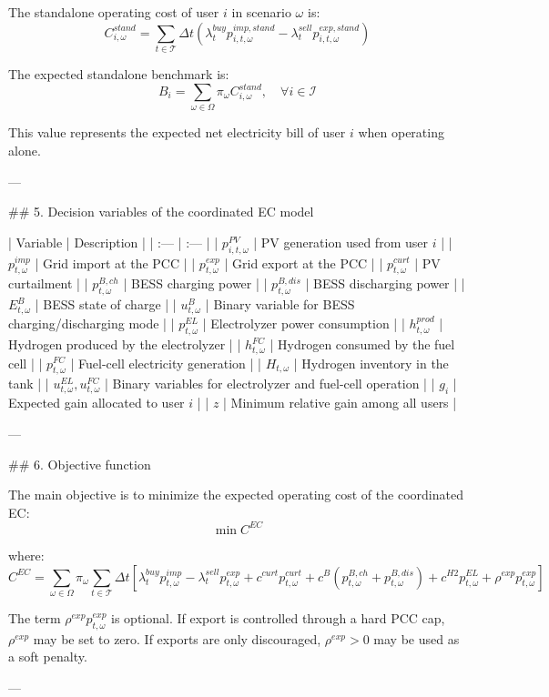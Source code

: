 The standalone operating cost of user $i$ in scenario $\omega$ is:
$$ C^{stand}_{i,\omega}=\sum_{t\in\mathcal{T}}\Delta t \left(\lambda^{buy}_{t}p^{imp,stand}_{i,t,\omega} -\lambda^{sell}_{t}p^{exp,stand}_{i,t,\omega}\right) $$

The expected standalone benchmark is:
$$ B_i=\sum_{\omega\in\Omega}\pi_{\omega}C^{stand}_{i,\omega}, \quad \forall i\in\mathcal{I} $$

This value represents the expected net electricity bill of user $i$ when operating alone.

---

## 5. Decision variables of the coordinated EC model

| Variable | Description |
| :--- | :--- |
| $p^{PV}_{i,t,\omega}$ | PV generation used from user $i$ |
| $p^{imp}_{t,\omega}$ | Grid import at the PCC |
| $p^{exp}_{t,\omega}$ | Grid export at the PCC |
| $p^{curt}_{t,\omega}$ | PV curtailment |
| $p^{B,ch}_{t,\omega}$ | BESS charging power |
| $p^{B,dis}_{t,\omega}$ | BESS discharging power |
| $E^{B}_{t,\omega}$ | BESS state of charge |
| $u^{B}_{t,\omega}$ | Binary variable for BESS charging/discharging mode |
| $p^{EL}_{t,\omega}$ | Electrolyzer power consumption |
| $h^{prod}_{t,\omega}$ | Hydrogen produced by the electrolyzer |
| $h^{FC}_{t,\omega}$ | Hydrogen consumed by the fuel cell |
| $p^{FC}_{t,\omega}$ | Fuel-cell electricity generation |
| $H_{t,\omega}$ | Hydrogen inventory in the tank |
| $u^{EL}_{t,\omega}, u^{FC}_{t,\omega}$ | Binary variables for electrolyzer and fuel-cell operation |
| $g_i$ | Expected gain allocated to user $i$ |
| $z$ | Minimum relative gain among all users |

---

## 6. Objective function

The main objective is to minimize the expected operating cost of the coordinated EC:
$$ \min C^{EC} $$

where:
$$ C^{EC}=\sum_{\omega\in\Omega}\pi_{\omega} \sum_{t\in\mathcal{T}}\Delta t \left[ \lambda^{buy}_{t}p^{imp}_{t,\omega} -\lambda^{sell}_{t}p^{exp}_{t,\omega} +c^{curt}p^{curt}_{t,\omega} +c^{B}\left(p^{B,ch}_{t,\omega}+p^{B,dis}_{t,\omega}\right) +c^{H2}p^{EL}_{t,\omega} +\rho^{exp}p^{exp}_{t,\omega} \right] $$

The term $\rho^{exp}p^{exp}_{t,\omega}$ is optional. If export is controlled through a hard PCC cap, $\rho^{exp}$ may be set to zero. If exports are only discouraged, $\rho^{exp}>0$ may be used as a soft penalty.

---

